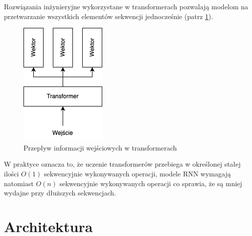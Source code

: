 \documentclass[12pt,a4paper,oneside]{book}
\begin{document}
\pagebreak

Rozwiązania inżynieryjne wykorzystane w transformerach pozwalają modelom na przetwarzanie wszystkich elementów sekwencji jednocześnie (patrz \ref{fig:transformer_schema}).

\begin{figure}[h]
    \centering
	\includegraphics[scale=0.75]{figs/transformer.png}
	\caption{Przepływ informacji wejściowych w transformerach}
	\label{fig:transformer_schema}
\end{figure}

W praktyce oznacza to, że uczenie transformerów przebiega w określonej stałej ilości $O(1)$ sekwencyjnie wykonywanych operacji, modele RNN wymagają natomiast $O(n)$ sekwencyjnie wykonywanych operacji co sprawia, że są mniej wydajne przy dłuższych sekwencjach.

\pagebreak

\section{Architektura}
\end{document}
